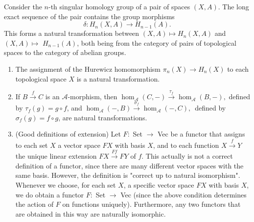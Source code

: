 \begin{example}
    Consider the $n$-th singular homology group of a pair of spaces $(X, A)$. The long exact sequence of the pair contains the group morphisms
$$
\delta: H_n(X, A) \rightarrow H_{n-1}(A) .
$$
\noindent
This forms a natural transformation between $(X, A) \mapsto H_n(X, A)$ and $(X, A) \mapsto$ $H_{n-1}(A)$, both being from the category of pairs of topological spaces to the category of abelian groups. \\



    \begin{enumerate}
        \item The assignment of the Hurewicz homomorphism $\pi_n(X) \rightarrow H_n(X)$ to each topological space $X$ is a natural transformation.
        \item If $B \xrightarrow{f} C$ is an $\mathcal{A}$-morphism, then
        $
        \operatorname{hom}_{\mathcal{A}}(C,-) \xrightarrow{\tau_f} \operatorname{hom}_{\mathcal{A}}(B,-),
        $
        defined by $\tau_f(g)=g \circ f$, and
        $
        \operatorname{hom}_{\mathcal{A}}(-, B) \xrightarrow{\sigma_f} \operatorname{hom}_{\mathcal{A}}(-, C) \text {, }
        $
        defined by $\sigma_f(g)=f \circ g$, are natural transformations.
        \item (Good definitions of extension) Let $F:$ Set $\rightarrow$ Vec be a functor that assigns to each set $X$ a vector space $F X$ with basis $X$, and to each function $X \xrightarrow{f} Y$ the unique linear extension $F X \xrightarrow{F f} F Y$ of $f$. This actually is not a correct definition of a functor, since there are many different vector spaces with the same basis. However, the definition is "correct up to natural isomorphism". Whenever we choose, for each set $X$, a specific vector space $F X$ with basis $X$, we do obtain a functor $F:$ Set $\rightarrow$ Vec (since the above condition determines the action of $F$ on functions uniquely). Furthermore, any two functors that are obtained in this way are naturally isomorphic.

\end{enumerate}
\end{example}
